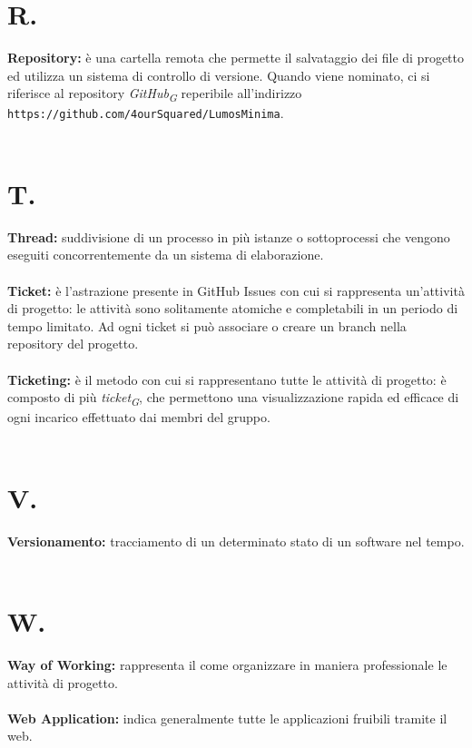 \documentclass[a4paper, 12pt]{article}
\begin{document}
\section{R.}
\textbf{Repository:} è una cartella remota che permette il salvataggio dei file
di progetto ed utilizza un sistema di controllo di versione. Quando
viene nominato, ci si riferisce al repository \textit{GitHub\textsubscript{G}} reperibile all’indirizzo \texttt{https://github.com/4ourSquared/LumosMinima}.  \\ \\

\newpage
\section{T.}
\textbf{Thread:} suddivisione di un processo in più istanze o sottoprocessi che vengono eseguiti concorrentemente da un sistema di elaborazione. \\ \\
\textbf{Ticket:} è l'astrazione presente in GitHub Issues con cui si rappresenta
un'attività di progetto: le attività sono solitamente atomiche e completabili in
un periodo di tempo limitato. Ad ogni ticket si può associare o creare un branch
nella repository del progetto.\\ \\
\textbf{Ticketing:} è il metodo con cui si rappresentano tutte le attività di
progetto: è composto di più \textit{ticket\textsubscript{G}}, che permettono una visualizzazione rapida ed
efficace di ogni incarico effettuato dai membri del gruppo. \\ \\
\newpage
\section{V.}
\textbf{Versionamento:} tracciamento di un determinato stato di un software nel tempo. \\ \\

\newpage
\section{W.}
\textbf{Way of Working:} rappresenta il come organizzare in maniera professionale le attività di progetto.\\ \\
\textbf{Web Application:} indica generalmente tutte le applicazioni fruibili
tramite il web.
\end{document}
